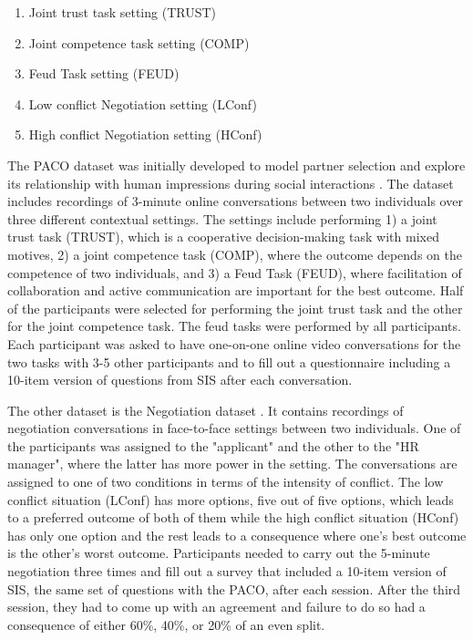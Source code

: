 \begin{enumerate}
    \item Joint trust task setting (TRUST)
    \item Joint competence task setting (COMP)
    \item Feud Task setting (FEUD)
    \item Low conflict Negotiation setting (LConf)
    \item High conflict Negotiation setting (HConf)
\end{enumerate}

The PACO dataset \cite{matej2022designing} was initially developed to model partner selection and explore its relationship with human impressions during social interactions \cite{matej2022designing}. The dataset includes recordings of 3-minute online conversations between two individuals over three different contextual settings. The settings include performing 1) a joint trust task (TRUST), which is a cooperative decision-making task with mixed motives, 2) a joint competence task (COMP), where the outcome depends on the competence of two individuals, and 3) a Feud Task (FEUD), where facilitation of collaboration and active communication are important for the best outcome. Half of the participants were selected for performing the joint trust task and the other for the joint competence task. The feud tasks were performed by all participants. Each participant was asked to have one-on-one online video conversations for the two tasks with 3-5 other participants and to fill out a questionnaire including a 10-item version of questions from SIS after each conversation.

The other dataset is the Negotiation dataset \cite{recorgnizing2021Dudzik}. It contains recordings of negotiation conversations in face-to-face settings between two individuals. One of the participants was assigned to the "applicant" and the other to the "HR manager", where the latter has more power in the setting. The conversations are assigned to one of two conditions in terms of the intensity of conflict. The low conflict situation (LConf) has more options, five out of five options, which leads to a preferred outcome of both of them while the high conflict situation (HConf) has only one option and the rest leads to a consequence where one's best outcome is the other's worst outcome. Participants needed to carry out the 5-minute negotiation three times and fill out a survey that included a 10-item version of SIS, the same set of questions with the PACO, after each session. After the third session, they had to come up with an agreement and failure to do so had a consequence of either 60\%, 40\%, or 20\% of an even split.

